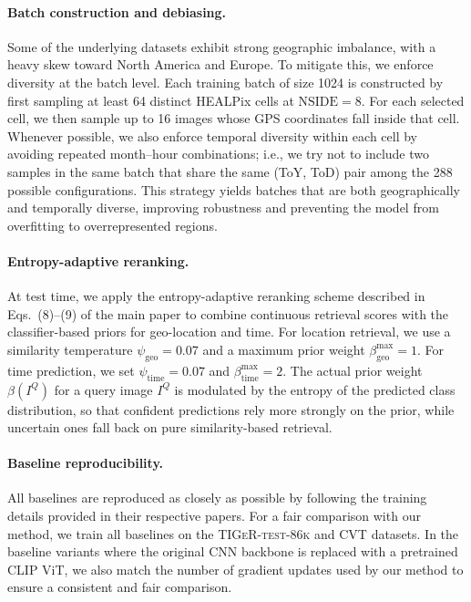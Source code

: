 \vspace{-1em}
\paragraph{Batch construction and debiasing.}
Some of the underlying datasets exhibit strong geographic imbalance, with a heavy skew toward North America and Europe.
To mitigate this, we enforce diversity at the batch level.
Each training batch of size 1024 is constructed by first sampling at least 64 distinct HEALPix cells at $\text{NSIDE}=8$.
For each selected cell, we then sample up to 16 images whose GPS coordinates fall inside that cell.
Whenever possible, we also enforce temporal diversity within each cell by avoiding repeated month--hour combinations; i.e., we try not to include two samples in the same batch that share the same (ToY, ToD) pair among the 288 possible configurations.
This strategy yields batches that are both geographically and temporally diverse, improving robustness and preventing the model from overfitting to overrepresented regions.

\vspace{-1em}
\paragraph{Entropy-adaptive reranking.}
At test time, we apply the entropy-adaptive reranking scheme described in Eqs.~(8)--(9) of the main paper to combine continuous retrieval scores with the classifier-based priors for geo-location and time.
For location retrieval, we use a similarity temperature $\psi_{\text{geo}} = 0.07$ and a maximum prior weight $\beta_{\text{geo}}^{\max} = 1$.
For time prediction, we set $\psi_{\text{time}} = 0.07$ and $\beta_{\text{time}}^{\max} = 2$.
The actual prior weight $\beta(I^Q)$ for a query image $I^Q$ is modulated by the entropy of the predicted class distribution, so that confident predictions rely more strongly on the prior, while uncertain ones fall back on pure similarity-based retrieval.

\vspace{-1em}
\paragraph{Baseline reproducibility.}
All baselines are reproduced as closely as possible by following the training details provided in their respective papers. For a fair comparison with our method, we train all baselines on the \textsc{TIGeR-test-86k} and CVT datasets. In the baseline variants where the original CNN backbone is replaced with a pretrained CLIP ViT, we also match the number of gradient updates used by our method to ensure a consistent and fair comparison.


